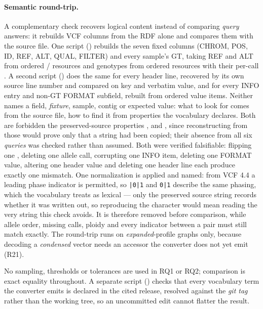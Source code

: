 \paragraph{Semantic round-trip.}
A complementary check recovers logical content instead of comparing \emph{query} answers: it rebuilds VCF columns from the RDF alone and compares them with the source file.
One script () rebuilds the seven fixed columns (CHROM, POS, ID, REF, ALT, QUAL, FILTER) and every sample's GT, taking REF and ALT from ordered / resources and genotypes from ordered  resources with their per-call .
A second script () does the same for every header line, recovered by its own source line number and compared on key and verbatim value, and for every INFO entry and non-GT FORMAT subfield, rebuilt from ordered value items.
Neither names a field, \emph{fixture}, sample, contig or expected value: what to look for comes from the source file, how to find it from properties the vocabulary declares.
Both are forbidden the preserved-source properties ,  and , since reconstructing from those would prove only that a string had been copied; their absence from all six \emph{queries} was checked rather than assumed.
Both were verified falsifiable: flipping one , deleting one allele call, corrupting one INFO item, deleting one FORMAT value, altering one header value and deleting one header line each produce exactly one mismatch.
One normalization is applied and named: from VCF 4.4 a leading phase indicator is permitted, so \texttt{|0|1} and \texttt{0|1} describe the same phasing, which the vocabulary treats as lexical --- only the preserved source string records whether it was written out, so reproducing the character would mean reading the very string this check avoids.
It is therefore removed before comparison, while allele order, missing calls, ploidy and every indicator between a pair must still match exactly.
The round-trip runs on \textit{expanded}-profile graphs only, because decoding a \textit{condensed} vector needs an accessor the converter does not yet emit (R21).

No sampling, thresholds or tolerances are used in RQ1 or RQ2; comparison is exact equality throughout.
A separate script () checks that every vocabulary term the converter emits is declared in the cited release, resolved against the \emph{git tag} rather than the working tree, so an uncommitted edit cannot flatter the result.

